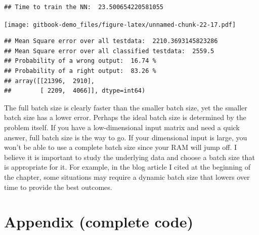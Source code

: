 \documentclass[
]{book}
\begin{document}
\begin{verbatim}
## Time to train the NN:  23.500654220581055
\end{verbatim}

\texttt{[image: gitbook-demo\_files/figure-latex/unnamed-chunk-22-17.pdf]}

\begin{verbatim}
## Mean Square error over all testdata:  2210.3693145823286
## Mean Square error over all classified testdata:  2559.5
## Probability of a wrong output:  16.74 %
## Probability of a right output:  83.26 %
## array([[21396,  2910],
##        [ 2209,  4066]], dtype=int64)
\end{verbatim}

The full batch size is clearly faster than the smaller batch size, yet the smaller batch size has a lower error. Perhaps the ideal batch size is determined by the problem itself. If you have a low-dimensional input matrix and need a quick answer, full batch size is the way to go. If your dimensional input is large, you won't be able to use a complete batch size since your RAM will jump off. I believe it is important to study the underlying data and choose a batch size that is appropriate for it. For example, in the blog article I cited at the beginning of the chapter, some situations may require a dynamic batch size that lowers over time to provide the best outcomes.

\hypertarget{appendix-complete-code-4}{%
\section{Appendix (complete code)}\label{appendix-complete-code-4}}
\end{document}
